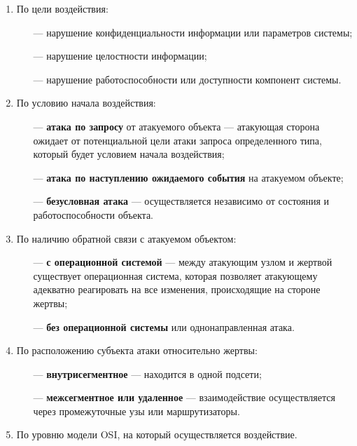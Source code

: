 \documentclass{bmstu}
\begin{document}
\begin{enumerate}
\begin{itemize}
        \end{itemize}
    \item По цели воздействия:
        \begin{itemize}
            \item[---] нарушение конфиденциальности информации или параметров системы;
            \item[---] нарушение целостности информации;
            \item[---] нарушение работоспособности или доступности компонент системы.
        \end{itemize}
    \item По условию начала воздействия:
        \begin{itemize}
            \item[---] \textbf{атака по запросу} от атакуемого объекта --- атакующая сторона ожидает от потенциальной цели атаки запроса определенного типа, который будет условием начала воздействия;
            \item[---] \textbf{атака по наступлению ожидаемого события} на атакуемом объекте;
            \item[---] \textbf{безусловная атака} --- осуществляется независимо от состояния и работоспособности объекта.
        \end{itemize}
    \item По наличию обратной связи с атакуемом объектом:
        \begin{itemize}
            \item[---] \textbf{с операционной системой} --- между атакующим узлом и жертвой существует операционная система, которая позволяет атакующему адекватно реагировать на все изменения, происходящие на стороне жертвы;
            \item[---] \textbf{без операционной системы} или однонаправленная атака.
        \end{itemize}
    \item По расположению субъекта атаки относительно жертвы:
        \begin{itemize}
            \item[---] \textbf{внутрисегментное} --- находится в одной подсети;
            \item[---] \textbf{межсегментное или удаленное} --- взаимодействие осуществляется через промежуточные узы или маршрутизаторы.
        \end{itemize}
    \item По уровню модели OSI, на который осуществляется воздействие.
\end{enumerate}
\end{document}
